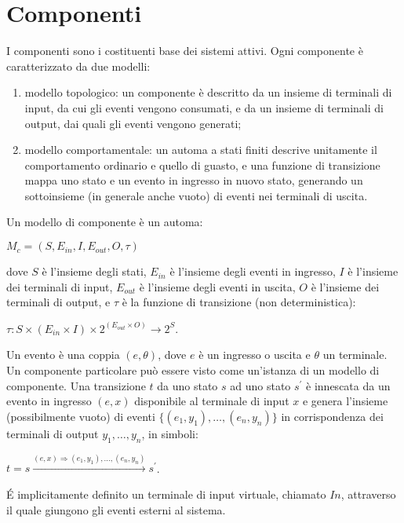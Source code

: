 \section{Componenti} 
I componenti sono i costituenti base dei sistemi attivi. Ogni componente è caratterizzato da due modelli:
\begin{enumerate}
\item modello topologico: un componente è descritto da un insieme di terminali di input, da cui gli eventi vengono consumati, e da un insieme di terminali di output, dai quali gli eventi vengono generati;
\item modello comportamentale: un automa a stati finiti descrive unitamente il comportamento ordinario e quello di guasto, e una funzione di transizione mappa uno stato e un evento in ingresso in nuovo stato, generando un sottoinsieme (in generale anche vuoto) di eventi nei terminali di uscita.  
\end{enumerate}

\begin{defn}
Un modello di componente è un automa:
\begin{center}
	$M_c = (S,E_{in},I,E_{out},O,\tau)$
\end{center}
dove $S$ è l'insieme degli stati, $E_{in}$ è l'insieme degli eventi in ingresso, $I$ è l'insieme dei terminali di input, $E_{out}$ è l'insieme degli eventi in uscita, $O$ è l'insieme dei terminali di output, e $\tau$ è la funzione di transizione (non deterministica):
\begin{center}
	$ \tau : S \times (E_{in} \times I) \times 2^{(E_{out} \times O)} \rightarrow 2^S $.
\end{center}

Un evento è una coppia $(e,\theta)$, dove $e$ è un ingresso o uscita e $\theta$ un terminale. Un componente particolare può essere visto come un'istanza di un modello di componente. 
Una transizione $t$ da uno stato $s$ ad uno stato $s^\prime$ è innescata da un evento in ingresso $(e,x)$ disponibile al terminale di input $x$ e genera l'insieme (possibilmente vuoto) di eventi 
$\{(e_1,y_1), \ldots ,(e_n,y_n)\}$ in corrispondenza dei terminali di output $y_1, \ldots,y_n$, in simboli:
\begin{center}
	$t = s \xrightarrow {(e,x) \Rightarrow (e_1,y_1), \ldots ,(e_n,y_n)} s^{\prime}$.
\end{center}
\end{defn}

\'E implicitamente definito un terminale di input virtuale, chiamato $In$, attraverso il quale giungono gli eventi esterni al sistema.

